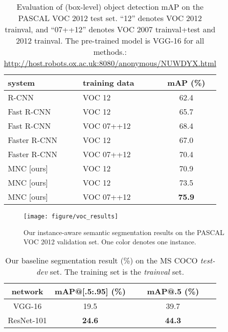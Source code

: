 \documentclass[10pt,twocolumn,letterpaper]{article}
\begin{document}
\setlength{\tabcolsep}{8pt}
\renewcommand{\arraystretch}{1.05}
\begin{table}[t]
\begin{center}
\small
\begin{tabular}{l|l|c}
system & training data & mAP (\%) \\
\hline
R-CNN \cite{Girshick2014} & VOC 12 & 62.4 \\
Fast R-CNN \cite{Girshick2015} & VOC 12 &  65.7 \\
Fast R-CNN \cite{Girshick2015} & VOC 07++12 &  68.4 \\
Faster R-CNN \cite{Ren2015} & VOC 12 & 67.0 \\
Faster R-CNN \cite{Ren2015} & VOC 07++12 & 70.4 \\
\hline
MNC [ours] & VOC 12 & 70.9 \\
MNC [ours] & VOC 12 & 73.5 \\
MNC [ours] & VOC 07++12 & \textbf{75.9} \\
\end{tabular}
\end{center}
\vspace{-.5em}
\caption{Evaluation of (box-level) object detection mAP on the PASCAL VOC 2012 test set. ``12'' denotes VOC 2012 trainval, and ``07++12'' denotes VOC 2007 trainval+test and 2012 trainval. The pre-trained model is VGG-16 for all methods.: \url{http://host.robots.ox.ac.uk:8080/anonymous/NUWDYX.html}}
\label{tab:det_result}
\end{table}


\begin{figure*}
\begin{center}
\texttt{[image: figure/voc\_results]}
\end{center}
\vspace{-1em}
\caption{Our instance-aware semantic segmentation results on the PASCAL VOC 2012 validation set. One color denotes one instance.}
\label{fig:voc_results}
\vspace{-1em}
\end{figure*}

\setlength{\tabcolsep}{8pt}
\renewcommand{\arraystretch}{1.05}
\begin{table}[t]
\begin{center}
\small
\begin{tabular}{c|c|c}
network & \footnotesize mAP@[.5:.95] (\%)  & \footnotesize ~~~mAP@.5 (\%)~~~\\
\hline
VGG-16 \cite{Simonyan2015} & 19.5 & 39.7 \\
ResNet-101 \cite{He2015a} & \textbf{24.6} & \textbf{44.3} \\
\end{tabular}	
\end{center}
\vspace{-1em}
\caption{Our baseline segmentation result (\%) on the MS COCO \emph{test-dev} set. The training set is the \emph{trainval} set.}
\label{tab:coco_result}
\end{table}
\end{document}
